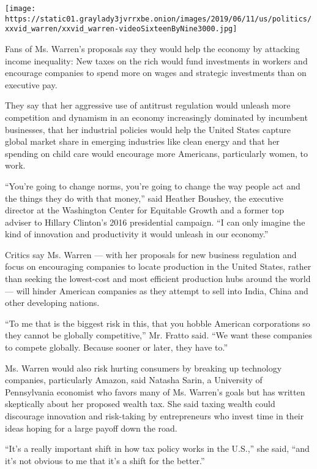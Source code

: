 \texttt{[image: https://static01.graylady3jvrrxbe.onion/images/2019/06/11/us/politics/xxvid\_warren/xxvid\_warren-videoSixteenByNine3000.jpg]}

Fans of Ms. Warren's proposals say they would help the economy by
attacking income inequality: New taxes on the rich would fund
investments in workers and encourage companies to spend more on wages
and strategic investments than on executive pay.

They say that her aggressive use of antitrust regulation would unleash
more competition and dynamism in an economy increasingly dominated by
incumbent businesses, that her industrial policies would help the United
States capture global market share in emerging industries like clean
energy and that her spending on child care would encourage more
Americans, particularly women, to work.

``You're going to change norms, you're going to change the way people
act and the things they do with that money,'' said Heather Boushey, the
executive director at the Washington Center for Equitable Growth and a
former top adviser to Hillary Clinton's 2016 presidential campaign. ``I
can only imagine the kind of innovation and productivity it would
unleash in our economy.''

Critics say Ms. Warren --- with her proposals for new business
regulation and focus on encouraging companies to locate production in
the United States, rather than seeking the lowest-cost and most
efficient production hubs around the world --- will hinder American
companies as they attempt to sell into India, China and other developing
nations.

``To me that is the biggest risk in this, that you hobble American
corporations so they cannot be globally competitive,'' Mr. Fratto said.
``We want these companies to compete globally. Because sooner or later,
they have to.''

Ms. Warren would also risk hurting consumers by breaking up technology
companies, particularly Amazon, said Natasha Sarin, a University of
Pennsylvania economist who favors many of Ms. Warren's goals but has
written skeptically about her proposed wealth tax. She said taxing
wealth could discourage innovation and risk-taking by entrepreneurs who
invest time in their ideas hoping for a large payoff down the road.

``It's a really important shift in how tax policy works in the U.S.,''
she said, ``and it's not obvious to me that it's a shift for the
better.''

